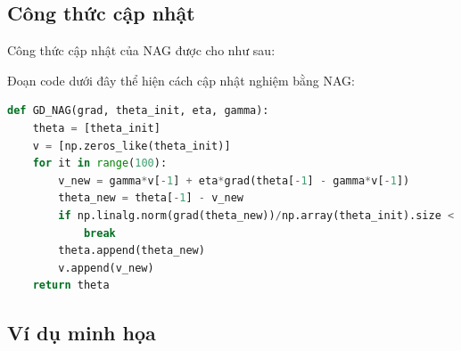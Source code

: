 \subsection{Công thức cập nhật}
 
Công thức cập nhật của NAG được cho như sau:





Đoạn code dưới đây thể hiện cách cập nhật nghiệm bằng NAG:
\begin{lstlisting}[language=Python]
def GD_NAG(grad, theta_init, eta, gamma):
    theta = [theta_init]
    v = [np.zeros_like(theta_init)]
    for it in range(100):
        v_new = gamma*v[-1] + eta*grad(theta[-1] - gamma*v[-1])
        theta_new = theta[-1] - v_new
        if np.linalg.norm(grad(theta_new))/np.array(theta_init).size < 1e-3:
            break
        theta.append(theta_new)
        v.append(v_new)
    return theta
\end{lstlisting}

\subsection{Ví dụ minh họa }

